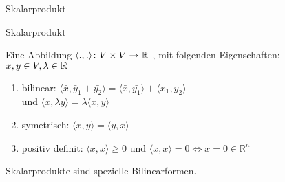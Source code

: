 \documentclass[class=article, crop=false]{standalone}
\begin{document}
\begin{zettel}{Skalarprodukt}
\begin{flashcard}{Skalarprodukt}
	\begin{definition}[Skalarprodukt]
		Eine Abbildung $ \langle .,.\rangle \colon V \times V\to \mathbb{R} $ , mit folgenden Eigenschaften:\\
		$x,y \in  V, \lambda \in  \mathbb{R} $
		\begin{enumerate}
			\item bilinear: $ \langle \bar{x},\bar{y}_1+\bar{y_2}\rangle  = \langle \bar{x},\bar{y_1}\rangle + \langle x_1,y_2\rangle $\\
			      und $ \langle x,\lambda y \rangle = \lambda \langle x,y\rangle $
			\item symetrisch: $ \langle x,y\rangle = \langle y,x\rangle $
			\item positiv definit: $ \langle x,x\rangle \geq 0 $ und $ \langle x,x\rangle  = 0 \iff  x = 0 \in  \mathbb{R}^n$
		\end{enumerate}
	\end{definition}
\end{flashcard}
\begin{remark}
	Skalarprodukte sind spezielle Bilinearformen.
\end{remark}
\end{zettel}
\end{document}
